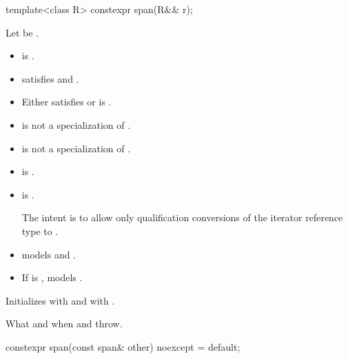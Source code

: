 %
\begin{itemdecl}
template<class R> constexpr span(R&& r);
\end{itemdecl}

\begin{itemdescr}
\pnum
\constraints
Let  be .
\begin{itemize}
\item {} is .
\item {} satisfies  and
  .
\item Either  satisfies  or
 is .
\item {} is not a specialization of .
\item {} is not a specialization of .
\item {} is .
\item
{} is .
\begin{note}
The intent is to allow only qualification conversions
of the iterator reference type to .
\end{note}
\end{itemize}

\pnum
\expects
\begin{itemize}
\item {} models  and
.
\item If  is ,
 models .
\end{itemize}

\pnum
\effects
Initializes  with  and
 with .

\pnum
\throws
What and when  and  throw.
\end{itemdescr}

%
\begin{itemdecl}
constexpr span(const span& other) noexcept = default;
\end{itemdecl}

